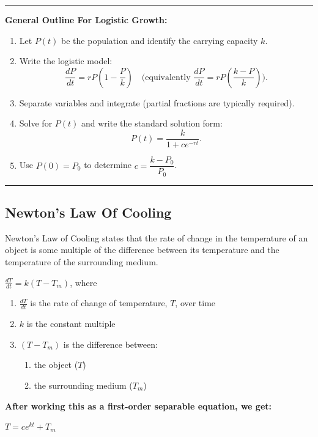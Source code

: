 \documentclass[11pt]{article}
\begin{document}
\noindent\rule{\linewidth}{0.4pt}
\textbf{General Outline For Logistic Growth:}
\begin{enumerate}[topsep=2pt, itemsep=2pt, leftmargin=*]
    \item Let $P(t)$ be the population and identify the carrying capacity $k$.
    \item Write the logistic model:
    \[
    \frac{dP}{dt}=rP\left(1-\frac{P}{k}\right)
    \quad\text{(equivalently } \frac{dP}{dt}=rP\left(\frac{k-P}{k}\right)\text{)}.
    \]
    \item Separate variables and integrate (partial fractions are typically required).
    \item Solve for $P(t)$ and write the standard solution form:
    \[
    P(t)=\frac{k}{1+ce^{-rt}}.
    \]
    \item Use $P(0)=P_0$ to determine $c=\dfrac{k-P_0}{P_0}$.
\end{enumerate}
\noindent\rule{\linewidth}{0.4pt}

\subsection{Newton's Law Of Cooling}

Newton's Law of Cooling states that the rate of change in the temperature of an object
is some multiple of the difference between its temperature and the temperature of the surrounding medium.

\begin{center}
  \large$\frac{dT}{dt} = k(T - T_{m})$\normalsize{, where}
\end{center}

\begin{enumerate}
  \item \textbf{$\frac{dT}{dt}$} is the rate of change of temperature, $T$, over time
  \item \textbf{$k$} is the constant multiple
  \item \textbf{$(T - T_{m})$} is the difference between:
   \begin{enumerate}
    \item the object ($T$)
    \item the surrounding medium ($T_{m}$)
   \end{enumerate}
\end{enumerate}

\textbf{After working this as a first-order separable equation, we get:}
\begin{center}
  \large$T = ce^{kt} + T_{m}$
\end{center}
\end{document}
